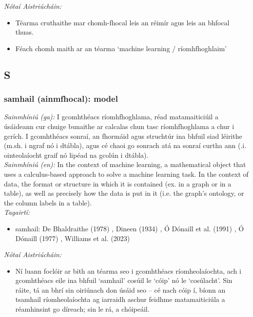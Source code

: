 \documentclass{article}
\begin{document}
 \noindent \textit{Nótaí Aistriúcháin:}
\begin{itemize}
	\item Téarma cruthaithe mar chomh-fhocal leis an réimír agus leis an bhfocal thuas.
	\item Féach chomh maith ar an téarma `machine learning / ríomhfhoghlaim'
\end{itemize}


\subsection*{S}

\subsubsection*{samhail (ainmfhocal): model}
 \noindent \textit{Sainmhíniú (ga):} I gcomhthéacs ríomhfhoghlama, réad matamaiticiúil a úsáideann cur chuige bunaithe ar calcalas chun tasc ríomhfhoghlama a chur i gcrích. I gcomhthéacs sonraí, an fhormáid agus struchtúr ina bhfuil siad léirithe (m.sh. i ngraf nó i dtábla), agus cé chaoi go sonrach atá na sonraí curtha ann (.i. ointeolaíocht graif nó lipéad na gcolún i dtábla).
\\
 \noindent \textit{Sainmhíniú (en):} In the context of machine learning, a mathematical object that uses a calculus-based approach to solve a machine learning task. In the context of data, the format or structure in which it is contained (ex. in a graph or in a table), as well as precisely how the data is put in it (i.e. the graph's ontology, or the column labels in a table).
\\
 \noindent \textit{Tagairtí:}
\begin{itemize}
	\item samhail: De Bhaldraithe (1978) \cite{de-bhaldraithe}, Dineen (1934) \cite{dineen}, Ó Dónaill et al. (1991) \cite{focloir-beag}, Ó Dónaill (1977) \cite{odonaill}, Williams et al. (2023) \cite{storchiste}
\end{itemize}

 \noindent \textit{Nótaí Aistriúcháin:}
\begin{itemize}
	\item Ní luann foclóir ar bith an téarma seo i gcomhthéacs ríomheolaíochta, ach i gcomhthéacs eile ina bhfuil `samhail' cosúil le `cóip' nó le `cosúlacht'. Sin ráite, tá an bhrí sin oiriúnach don úsáid seo -- cé nach cóip í, bíonn an tsamhail ríomheolaíochta ag iarraidh aschur feidhme matamaiticiúla a réamhinsint go díreach; sin le rá, a chóipeáil.
\end{itemize}
\end{document}
